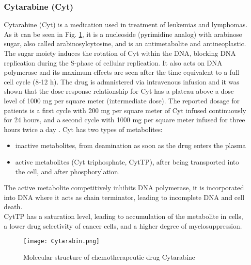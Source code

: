 \subsubsection{Cytarabine (Cyt)}
Cytarabine (Cyt) is a medication used in treatment of leukemias and lymphomas. As it can be seen in Fig. \ref{fig:Cyt}, it is a nucleoside (pyrimidine analog) with arabinose sugar, also called arabinosylcytosine, and is an antimetabolite and antineoplastic.
The sugar moiety induces the rotation of Cyt within the DNA, blocking DNA replication during the S-phase of cellular replication. It also acts on DNA polymerase and its maximum effects are seen after the time equivalent to a full cell cycle (8-12 h). 
The drug is admnistered via intravenous infusion and it was shown that the dose-response relationship for Cyt has a plateau above a dose level of 1000 mg per square meter (intermediate dose). The reported dosage for patients is a first cycle with 200 mg per square meter of Cyt infused continuously for 24 hours, and a second cycle with 1000 mg per square meter infused for three hours twice a day \cite{cyt-3}.
Cyt has two types of metabolites: 
\begin{itemize}
	\item inactive metabolites, from deamination as soon as the drug enters the plasma
	\item active metabolites (Cyt triphosphate, CytTP), after being transported into the cell, and after phosphorylation.
\end{itemize}
The active metabolite competitively inhibits DNA polymerase, it is incorporated into DNA where it acts as chain terminator, leading to incomplete DNA and cell death.\\
CytTP has a saturation level, leading to accumulation of the metabolite in cells, a lower drug selectivity of cancer cells, and a higher degree of myelosuppression.\cite{cyt-1, cyt-2}
\begin{figure}[htbp!]
	\centering
	\texttt{[image: Cytarabin.png]}
	\caption{Molecular structure of chemotherapeutic drug Cytarabine}
	\label{fig:Cyt}
\end{figure}

